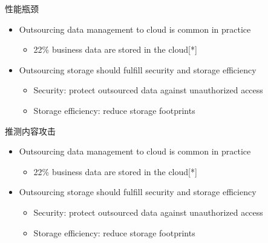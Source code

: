 \documentclass{beamer}
\begin{document}
\begin{frame}{性能瓶颈}
    \begin{itemize}
        \item Outsourcing data management to cloud is common in practice
              \begin{itemize}
                  \item 22\% business data are stored in the cloud[*]
              \end{itemize}
        \item  Outsourcing storage should fulfill security and storage efficiency
              \begin{itemize}
                  \item  Security: protect outsourced data against unauthorized access
                  \item  Storage efficiency: reduce storage footprints
              \end{itemize}
    \end{itemize}
\end{frame}

\begin{frame}{推测内容攻击}
    \begin{itemize}
        \item Outsourcing data management to cloud is common in practice
              \begin{itemize}
                  \item 22\% business data are stored in the cloud[*]
              \end{itemize}
        \item  Outsourcing storage should fulfill security and storage efficiency
              \begin{itemize}
                  \item  Security: protect outsourced data against unauthorized access
                  \item  Storage efficiency: reduce storage footprints
              \end{itemize}
    \end{itemize}
\end{frame}
\end{document}

